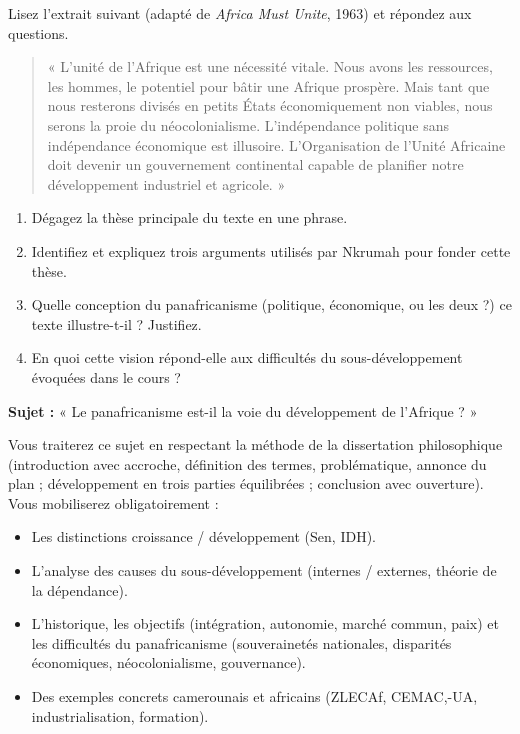 \documentclass[11pt]{article}
\newcounter{popsec}
\newcounter{popsub}
\newcommand{\courssub}[1]{%
  \stepcounter{popsub}%
  \par\vspace{9pt}\noindent{\popxbold\fontsize{11.5}{13}\selectfont\color{popink}{\color{poporange}\thepopsec.\thepopsub}\hspace{6pt}#1}\par\nopagebreak\vspace{4pt}
}
\begin{document}
\begin{exercice}
Lisez l'extrait suivant (adapté de \emph{Africa Must Unite}, 1963) et répondez aux questions.

\begin{quote}
« L'unité de l'Afrique est une nécessité vitale. Nous avons les ressources, les hommes, le potentiel pour bâtir une Afrique prospère. Mais tant que nous resterons divisés en petits États économiquement non viables, nous serons la proie du néocolonialisme. L'indépendance politique sans indépendance économique est illusoire. L'Organisation de l'Unité Africaine doit devenir un gouvernement continental capable de planifier notre développement industriel et agricole. »
\end{quote}

\begin{enumerate}
\item Dégagez la thèse principale du texte en une phrase.
\item Identifiez et expliquez trois arguments utilisés par Nkrumah pour fonder cette thèse.
\item Quelle conception du panafricanisme (politique, économique, ou les deux ?) ce texte illustre-t-il ? Justifiez.
\item En quoi cette vision répond-elle aux difficultés du sous-développement évoquées dans le cours ?
\end{enumerate}
\end{exercice}

\courssub{Je me prépare au Bac}

\begin{exercice}
\textbf{Sujet :} « Le panafricanisme est-il la voie du développement de l'Afrique ? »

Vous traiterez ce sujet en respectant la méthode de la dissertation philosophique (introduction avec accroche, définition des termes, problématique, annonce du plan ; développement en trois parties équilibrées ; conclusion avec ouverture). Vous mobiliserez obligatoirement :
\begin{itemize}
\item Les distinctions croissance / développement (Sen, IDH).
\item L'analyse des causes du sous-développement (internes / externes, théorie de la dépendance).
\item L'historique, les objectifs (intégration, autonomie, marché commun, paix) et les difficultés du panafricanisme (souverainetés nationales, disparités économiques, néocolonialisme, gouvernance).
\item Des exemples concrets camerounais et africains (ZLECAf, CEMAC,-UA, industrialisation, formation).
\end{itemize}
\end{exercice}
\end{document}
